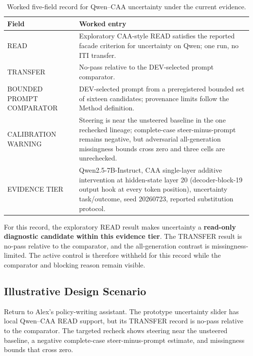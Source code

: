 \documentclass[manuscript,review,anonymous]{acmart}
\newcommand{\TopRule}{\toprule}
\begin{document}
\begin{table}[t]
\centering
\footnotesize
\caption{Worked five-field record for Qwen--CAA uncertainty under the current evidence.}
\label{tab:worked-record}
\begin{tabular}{@{}p{}p{}@{}}
\TopRule
Field & Worked entry \\
\midrule
READ & Exploratory CAA-style READ satisfies the reported facade criterion for uncertainty on Qwen; one run, no ITI transfer. \\
TRANSFER & No-pass relative to the DEV-selected prompt comparator. \\
BOUNDED PROMPT COMPARATOR & DEV-selected prompt from a preregistered bounded set of sixteen candidates; provenance limits follow the Method definition. \\
CALIBRATION WARNING & Steering is near the unsteered baseline in the one rechecked lineage; complete-case steer-minus-prompt remains negative, but adversarial all-generation missingness bounds cross zero and three cells are unrechecked. \\
EVIDENCE TIER & Qwen2.5-7B-Instruct, CAA single-layer additive intervention at hidden-state layer 20 (decoder-block-19 output hook at every token position), uncertainty task/outcome, seed 20260723, reported substitution protocol. \\
\bottomrule
\end{tabular}
\end{table}

For this record, the exploratory READ result makes uncertainty a \textbf{read-only diagnostic candidate within this evidence tier}. The TRANSFER result is no-pass relative to the comparator, and the all-generation contrast is missingness-limited. {}%
{}%
The active control is therefore withheld for this record while the comparator and blocking reason remain visible.

\subsection{Illustrative Design Scenario}\label{illustrative-design-scenario}

Return to Alex's policy-writing assistant. The prototype uncertainty slider has local Qwen--CAA READ support, but its TRANSFER record is no-pass relative to the comparator. The targeted recheck shows steering near the unsteered baseline, a negative complete-case steer-minus-prompt estimate, and missingness bounds that cross zero. {}%
{}%
\end{document}
